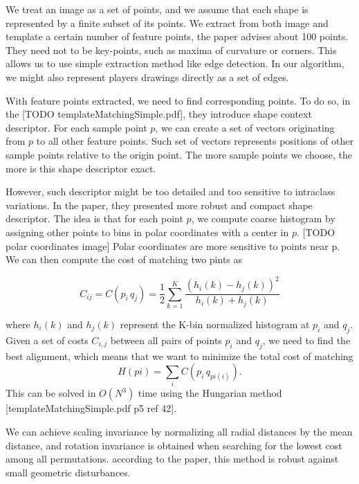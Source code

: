 We treat an image as a set of points, and we assume that each shape is represented by a finite subset of its points. We extract from both image and template a certain number of feature points, the paper advises about 100 points. They need not to be key-points, such as maxima of curvature or corners. This allows us to use simple extraction method like edge detection. In our algorithm, we might also represent players drawings directly as a set of edges. 

With feature points extracted, we need to find corresponding points. To do so, in the [TODO templateMatchingSimple.pdf], they introduce shape context descriptor. For each sample point $p$, we can create a set of vectors originating from $p$ to all other feature points. Such set of vectors represents positions of other sample points relative to the origin point. The more sample points we choose, the more is this shape descriptor exact.

However, such descriptor might be too detailed and too sensitive to intraclass variations. In the paper, they presented more robust and compact shape descriptor. The idea is that for each point $p$, we compute coarse histogram by assigning other points to bins in polar coordinates with a center in $p$. [TODO polar coordinates image] Polar coordinates are more sensitive to points near p. We can then compute the cost of matching two pints as 

\begin{equation*}
C_{ij} =  C(p_{i}\,q_{j}) = \frac{1}{2} \sum_{k=1}^{K} \frac{(h_{i}(k) - h_{j}(k))^2}{h_{i}(k) + h_{j}(k)}
\end{equation*}

where $ h_{i}(k) $ and $ h_{j}(k) $ represent the K-bin normalized histogram at $p_{i}$ and $q_{j}$. Given a set of costs $C_{i,j}$ between all pairs of points $p_{i}$ and $q_{j}$, we need to find the best alignment, which means that we want to minimize the total cost of matching 
\begin{equation*}
H(pi) = \sum_{i} C(p_{i}\,q_{pi(i)}).
\end{equation*}
This can be solved in $O(N^3)$ time using the Hungarian method [templateMatchingSimple.pdf p5 ref 42]. 

We can achieve scaling invariance by normalizing all radial distances by the mean distance, and rotation invariance is obtained when searching for the lowest cost among all permutations. according to the paper, this method is robust against small geometric disturbances.

